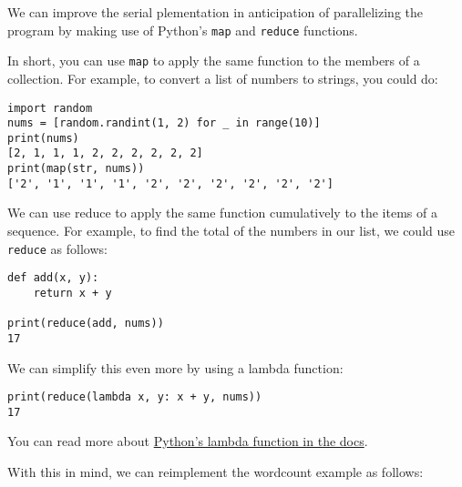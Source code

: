 We can improve the serial plementation in anticipation of parallelizing
the program by making use of Python's \texttt{map} and \texttt{reduce}
functions.

In short, you can use \texttt{map} to apply the same function to the
members of a collection. For example, to convert a list of numbers to
strings, you could do:

\begin{lstlisting}
import random
nums = [random.randint(1, 2) for _ in range(10)]
print(nums)
[2, 1, 1, 1, 2, 2, 2, 2, 2, 2]
print(map(str, nums))
['2', '1', '1', '1', '2', '2', '2', '2', '2', '2']
\end{lstlisting}

We can use reduce to apply the same function cumulatively to the items
of a sequence. For example, to find the total of the numbers in our
list, we could use \texttt{reduce} as follows:

\begin{lstlisting}
def add(x, y): 
    return x + y

print(reduce(add, nums))
17
\end{lstlisting}

We can simplify this even more by using a lambda function:

\begin{lstlisting}
print(reduce(lambda x, y: x + y, nums))
17
\end{lstlisting}

You can read more about
\href{https://docs.python.org/2.7/tutorial/controlflow.html\#lambda-expressions}{Python's
lambda function in the docs}.

With this in mind, we can reimplement the wordcount example as follows:

